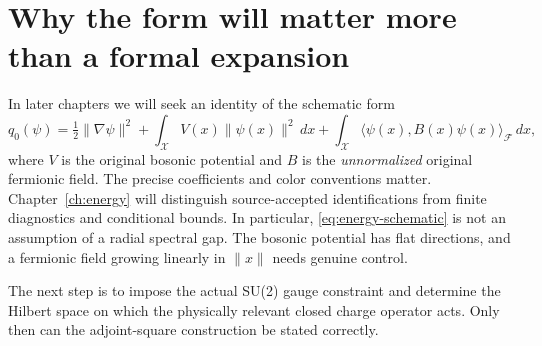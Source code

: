\section{Why the form will matter more than a formal expansion}
In later chapters we will seek an identity of the schematic form
\begin{equation}\label{eq:energy-schematic}
 q_0(\psi)=\tfrac12\|\nabla\psi\|^2
 +\int_{\mathcal X} V(x)\|\psi(x)\|^2\,dx
 +\int_{\mathcal X}\langle\psi(x),B(x)\psi(x)\rangle_{\mathcal F}\,dx,
\end{equation}
where $V$ is the original bosonic potential and $B$ is the \emph{unnormalized}
original fermionic field. The precise coefficients and color conventions
matter. Chapter~\ref{ch:energy} will distinguish source-accepted
identifications from finite diagnostics and conditional bounds. In
particular, \eqref{eq:energy-schematic} is not an assumption of a radial
spectral gap. The bosonic potential has flat directions, and a fermionic
field growing linearly in $\|x\|$ needs genuine control.

The next step is to impose the actual SU(2) gauge constraint and determine
the Hilbert space on which the physically relevant closed charge operator
acts. Only then can the adjoint-square construction be stated correctly.
